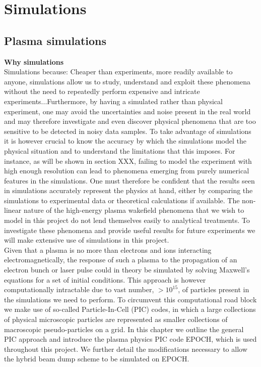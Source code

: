 \chapter{Simulations}
\section{Plasma simulations}
\textbf{Why simulations}\\
Simulations because: Cheaper than experiments, more readily available to anyone, simulations allow us to study, understand and exploit these phenomena without the need to repeatedly perform expensive and intricate experiments...Furthermore, by having a simulated rather than physical experiment, one may avoid the uncertainties and noise present in the real world and may therefore investigate and even discover physical phenomena that are too sensitive to be detected in noisy data samples. To take advantage of simulations it is however crucial to know the accuracy by which the simulations model the physical situation and to understand the limitations that this imposes. For instance, as will be shown in section XXX, failing to model the experiment with high enough resolution can lead to phenomena emerging from purely numerical features in the simulations. One must therefore be confident that the results seen in simulations accurately represent the physics at hand, either by comparing the simulations to experimental data or theoretical calculations if available. The non-linear nature of the high-energy plasma wakefield phenomena that we wish to model in this project do not lend themselves easily to analytical treatments. To investigate these phenomena and provide useful results for future experiments we will make extensive use of simulations in this project.\\ 
Given that a plasma is no more than electrons and ions interacting electromagnetically, the response of such a plasma to the propagation of an electron bunch or laser pulse could in theory be simulated by solving Maxwell's equations for a set of initial conditions. This approach is however computationally intractable due to vast number, $>10^{15}$, of particles present in the simulations we need to perform. To circumvent this computational road block we make use of so-called Particle-In-Cell (PIC) codes, in which a large collections of physical microscopic particles are represented as smaller collections of macroscopic pseudo-particles on a grid. In this chapter we outline the general PIC approach and introduce the plasma physics PIC code EPOCH, which is used throughout this project. We further detail the modifications necessary to allow the hybrid beam dump scheme to be simulated on EPOCH. 

